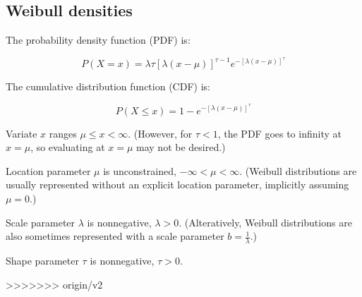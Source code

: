 \subsection{Weibull densities}

The probability density function (PDF) is:

\begin{equation}
P(X=x) = \lambda \tau [\lambda(x - \mu)]^{\tau-1} e^{- [\lambda(x-\mu)]^{\tau}}
\label{eqn:weibull_pdf}
\end{equation}

The cumulative distribution function (CDF) is:

\begin{equation}
P(X \leq x) = 1 - e^{- [\lambda(x-\mu)]^{\tau}}
\label{eqn:weibull_cdf}
\end{equation}

Variate $x$ ranges $\mu \leq x < \infty$. (However, for $\tau < 1$,
the PDF goes to infinity at $x=\mu$, so evaluating at $x=\mu$ may not
be desired.)

Location parameter $\mu$ is unconstrained, $-\infty < \mu <
\infty$. (Weibull distributions are usually represented without an
explicit location parameter, implicitly assuming $\mu = 0$.)

Scale parameter $\lambda$ is nonnegative, $\lambda >
0$. (Alteratively, Weibull distributions are also sometimes
represented with a scale parameter $b = \frac{1}{\lambda}$.)

Shape parameter $\tau$ is nonnegative, $\tau > 0$. 






>>>>>>> origin/v2
